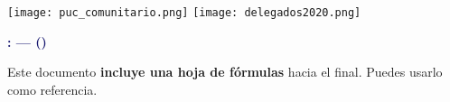 
\begin{coverpages}
    \begin{flushleft}

        \texttt{[image: puc\_comunitario.png]}
        \texttt{[image: delegados2020.png]} \\ \vspace{10mm}

        \textcolor{MidnightBlue}{\textbf{\Large \codigoDelCurso{}: \elCurso{} --- \fecha{} (\nombreDocumento)}} \\[\baselineskip]

        \descripcionPortada{}

        {Este documento \textbf{incluye una hoja de fórmulas} hacia el final. Puedes usarlo como referencia.\\[\baselineskip]} %


\end{flushleft}
\end{coverpages}
